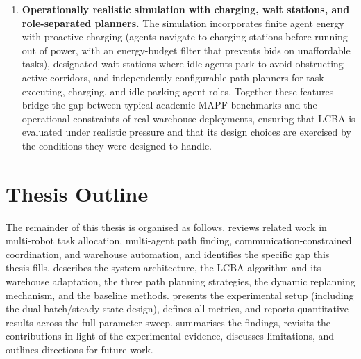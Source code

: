 \begin{enumerate}
  \item \textbf{Operationally realistic simulation with charging, wait stations,
        and role-separated planners.}
        The simulation incorporates finite agent energy with proactive charging
        (agents navigate to charging stations before running out of power, with an
        energy-budget filter that prevents bids on unaffordable tasks),
        designated wait stations where idle agents park to avoid obstructing active
        corridors, and independently configurable path planners for task-executing,
        charging, and idle-parking agent roles.
        Together these features bridge the gap between typical academic MAPF benchmarks
        and the operational constraints of real warehouse deployments, ensuring that
        LCBA is evaluated under realistic pressure and that its design choices are
        exercised by the conditions they were designed to handle.
\end{enumerate}


\section{Thesis Outline}
\label{sec:intro_outline}

The remainder of this thesis is organised as follows.
 reviews related work in multi-robot task allocation,
multi-agent path finding, communication-constrained coordination, and warehouse
automation, and identifies the specific gap this thesis fills.
 describes the system architecture, the LCBA algorithm
and its warehouse adaptation, the three path planning strategies, the dynamic
replanning mechanism, and the baseline methods.
 presents the experimental setup (including the dual
batch/steady-state design), defines all metrics, and reports quantitative
results across the full parameter sweep.
 summarises the findings, revisits the contributions
in light of the experimental evidence, discusses limitations, and outlines
directions for future work.